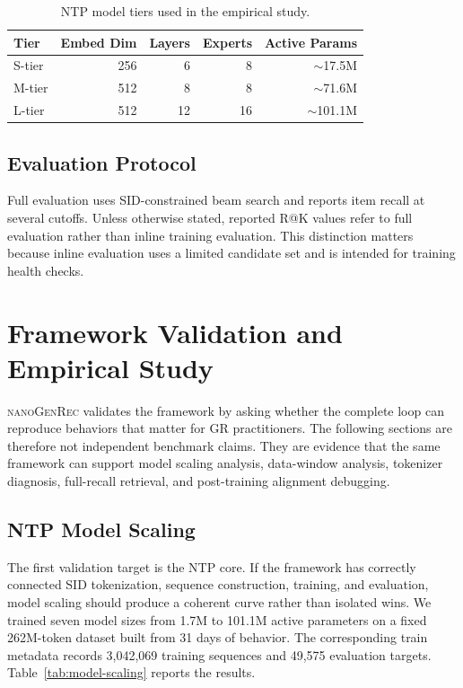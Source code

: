 \documentclass[11pt]{article}
\begin{document}
\begin{table}[t]
\centering
\caption{NTP model tiers used in the empirical study.}
\label{tab:tiers}
\begin{tabular}{lrrrr}
\toprule
Tier & Embed Dim & Layers & Experts & Active Params \\
\midrule
S-tier & 256 & 6 & 8 & $\sim$17.5M \\
M-tier & 512 & 8 & 8 & $\sim$71.6M \\
L-tier & 512 & 12 & 16 & $\sim$101.1M \\
\bottomrule
\end{tabular}
\end{table}

\subsection{Evaluation Protocol}

Full evaluation uses SID-constrained beam search and reports item recall at several cutoffs. Unless otherwise stated, reported R@K values refer to full evaluation rather than inline training evaluation. This distinction matters because inline evaluation uses a limited candidate set and is intended for training health checks.

\section{Framework Validation and Empirical Study}

\textsc{nanoGenRec} validates the framework by asking whether the complete loop can reproduce behaviors that matter for GR practitioners. The following sections are therefore not independent benchmark claims. They are evidence that the same framework can support model scaling analysis, data-window analysis, tokenizer diagnosis, full-recall retrieval, and post-training alignment debugging.

\subsection{NTP Model Scaling}

The first validation target is the NTP core. If the framework has correctly connected SID tokenization, sequence construction, training, and evaluation, model scaling should produce a coherent curve rather than isolated wins. We trained seven model sizes from 1.7M to 101.1M active parameters on a fixed 262M-token dataset built from 31 days of behavior. The corresponding train metadata records 3,042,069 training sequences and 49,575 evaluation targets. Table~\ref{tab:model-scaling} reports the results.
\end{document}
